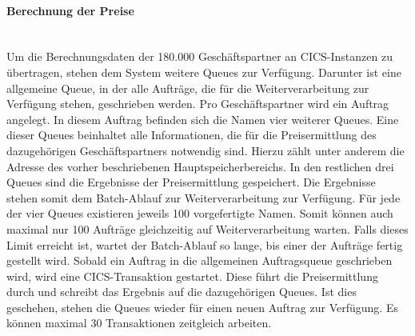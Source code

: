 \paragraph{Berechnung der Preise}~\\
Um die Berechnungsdaten der 180.000 Geschäftspartner an CICS-Instanzen zu übertragen, stehen dem System weitere Queues zur Verfügung.
Darunter ist eine allgemeine Queue, in der alle Aufträge, die für die Weiterverarbeitung zur Verfügung stehen, geschrieben werden.
Pro Geschäftspartner wird ein Auftrag angelegt.
In diesem Auftrag befinden sich die Namen vier weiterer Queues.
Eine dieser Queues beinhaltet alle Informationen, die für die Preisermittlung des dazugehörigen Geschäftspartners notwendig sind.
Hierzu zählt unter anderem die Adresse des vorher beschriebenen Hauptspeicherbereichs.
In den restlichen drei Queues sind die Ergebnisse der Preisermittlung gespeichert.
Die Ergebnisse stehen somit dem Batch-Ablauf zur Weiterverarbeitung zur Verfügung.
Für jede der vier Queues existieren jeweils 100 vorgefertigte Namen.
Somit können auch maximal nur 100 Aufträge gleichzeitig auf Weiterverarbeitung warten.
Falls dieses Limit erreicht ist, wartet der Batch-Ablauf so lange, bis einer der Aufträge fertig gestellt wird.
Sobald ein Auftrag in die allgemeinen Auftragsqueue geschrieben wird, wird eine CICS-Transaktion gestartet.
Diese führt die Preisermittlung durch und schreibt das Ergebnis auf die dazugehörigen Queues.
Ist dies geschehen, stehen die Queues wieder für einen neuen Auftrag zur Verfügung.
Es können maximal 30 Transaktionen zeitgleich arbeiten.
